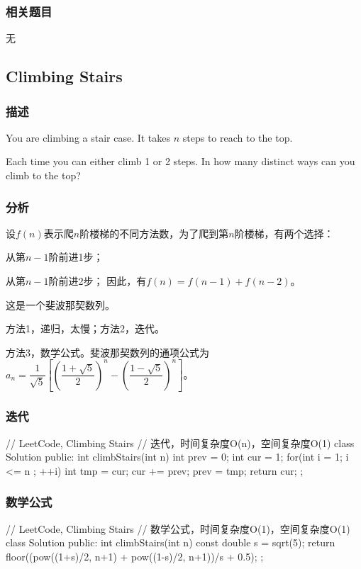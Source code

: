 \subsubsection{相关题目}
\begindot
\item 无
\myenddot


\subsection{Climbing Stairs} %
\label{sec:climbing-stairs}


\subsubsection{描述}
You are climbing a stair case. It takes $n$ steps to reach to the top.

Each time you can either climb 1 or 2 steps. In how many distinct ways can you 
climb to the top?


\subsubsection{分析}
设$f(n)$表示爬$n$阶楼梯的不同方法数，为了爬到第$n$阶楼梯，有两个选择：
\begindot
\item 从第$n-1$阶前进1步；
\item 从第$n-1$阶前进2步；
\myenddot
因此，有$f(n)=f(n-1)+f(n-2)$。

这是一个斐波那契数列。

方法1，递归，太慢；方法2，迭代。

方法3，数学公式。斐波那契数列的通项公式为 
$a_n=\dfrac{1}{\sqrt{5}}\left[\left(\dfrac{1+\sqrt{5}}{2}\right)^n-\left(\dfrac{1-\sqrt{5}}{2}\right)^n\right]$。


\subsubsection{迭代}
\begin{Code}
	// LeetCode, Climbing Stairs
	// 迭代，时间复杂度O(n)，空间复杂度O(1)
	class Solution {
		public:
		int climbStairs(int n) {
			int prev = 0;
			int cur = 1;
			for(int i = 1; i <= n ; ++i){
				int tmp = cur;
				cur += prev;
				prev = tmp;
			}
			return cur;
		}
	};
\end{Code}


\subsubsection{数学公式}
\begin{Code}
	// LeetCode, Climbing Stairs
	// 数学公式，时间复杂度O(1)，空间复杂度O(1)
	class Solution {
		public:
		int climbStairs(int n) {
			const double s = sqrt(5);
			return floor((pow((1+s)/2, n+1) + pow((1-s)/2, n+1))/s + 0.5);
		}
	};
\end{Code}


